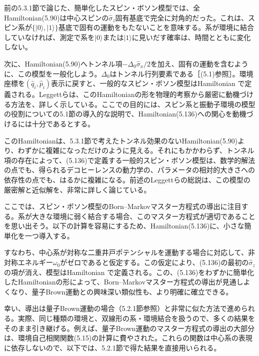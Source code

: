 前の5.3.1節で論じた、簡単化したスピン・ボソン模型では、全Hamiltonian(5.90)は中心スピンの$\hat\sigma_z$固有基底で完全に対角的だった。これは、スピン系が$\{|0\rangle,|1\rangle\}$基底で固有の運動をもたないことを意味する。系が環境に結合していなければ、測定で系を$|0\rangle$または$|1\rangle$に見いだす確率は、時間とともに変化しない。

次に、Hamiltonian(5.90)へトンネル項$-\Delta_0\hat\sigma_x/2$を加え、固有の運動を含むように、この模型を一般化しよう。$\Delta_0$はトンネル行列要素である［(5.1)参照］。環境座標を$(\hat q_i,\hat p_i)$表示に戻すと、一般的なスピン・ボソン模型はHamiltonian
で定義される。Leggettら\cite{ref209}は、このHamiltonianの形を物理的考察から厳密に動機づける方法を、詳しく示している。ここでの目的には、スピン系と振動子環境の模型の役割についての5.1節の導入的な説明で、Hamiltonian(5.136)への関心を動機づけるには十分であるとする。

このHamiltonianは、5.3.1節で考えたトンネル効果のないHamiltonian(5.90)より、わずかに複雑になっただけのように見える。それにもかかわらず、トンネル項の存在によって、(5.136)で定義する一般的スピン・ボソン模型は、数学的解法の点でも、得られるデコヒーレンスの動力学の、パラメータの相対的大きさへの依存性の点でも、はるかに複雑になる。前述のLeggettらの総説\cite{ref209}は、この模型の厳密解と近似解を、非常に詳しく論じている。

ここでは、スピン・ボソン模型のBorn--Markovマスター方程式の導出に注目する。系が大きな環境に弱く結合する場合、このマスター方程式が適切であることを思い出そう。以下の計算を容易にするため、Hamiltonian(5.136)に、小さな簡単化を一つ導入する。

\hypertarget{srcpage:219}{}\label{srcpage:219}
すなわち、中心系が対称な二重井戸ポテンシャルを運動する場合に対応して、非対称エネルギー$\omega_0$がゼロであると仮定する。この仮定により、(5.136)の最初の$\hat\sigma_z$の項が消え、模型はHamiltonian
で定義される。この、(5.136)をわずかに簡単化したHamiltonianの形によって、Born--Markovマスター方程式の導出が見通しよくなり、量子Brown運動との興味深い類似性も、より明確に確立できる。

幸い、導出は量子Brown運動の場合（5.2.1節参照）と非常に似た方法で進められる。実際、同じ種類の環境と、双線形の系・環境結合を扱うので、多くの結果をそのまま引き継げる。例えば、量子Brown運動のマスター方程式の導出の大部分は、環境自己相関関数(5.15)の計算に費やされた。これらの関数は中心系の表現に依存しないので、以下では、5.2.1節で得た結果を直接用いられる。

